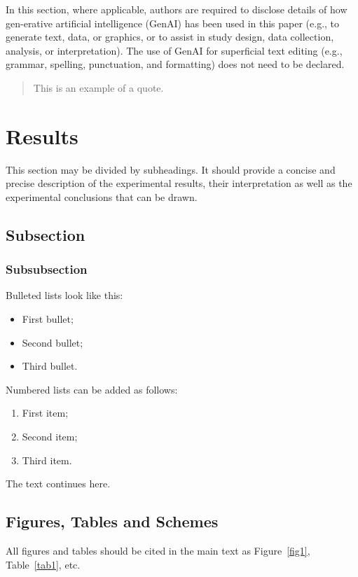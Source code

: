 \documentclass[preprints,article,submit,pdftex,moreauthors]{Definitions/mdpi}
\begin{document}
In this section, where applicable, authors are required to disclose details of how gen-erative artificial intelligence (GenAI) has been used in this paper (e.g., to generate text, data, or graphics, or to assist in study design, data collection, analysis, or interpretation). The use of GenAI for superficial text editing (e.g., grammar, spelling, punctuation, and formatting) does not need to be declared.

\begin{quote}
This is an example of a quote.
\end{quote}

\section{Results}

This section may be divided by subheadings. It should provide a concise and precise description of the experimental results, their interpretation as well as the experimental conclusions that can be drawn.
\subsection{Subsection}
\subsubsection{Subsubsection}

Bulleted lists look like this:
\begin{itemize}
\item	First bullet;
\item	Second bullet;
\item	Third bullet.
\end{itemize}

Numbered lists can be added as follows:
\begin{enumerate}
\item	First item; 
\item	Second item;
\item	Third item.
\end{enumerate}

The text continues here.

\subsection{Figures, Tables and Schemes}

All figures and tables should be cited in the main text as Figure~\ref{fig1}, Table~\ref{tab1}, etc.
\end{document}
